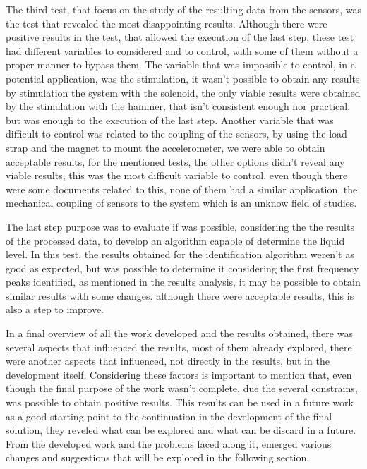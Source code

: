 The third test, that focus on the study of the resulting data from the sensors, was the test that revealed the most disappointing results. Although there were positive results in the test, that allowed the execution of the last step, these test had different variables to considered and to control, with some of them without a proper manner to bypass them. The variable that was impossible to control, in a potential application, was the stimulation, it wasn't possible to obtain any results by stimulation the system with the solenoid, the only viable results were obtained by the stimulation with the hammer, that isn't consistent enough nor practical, but was enough to the execution of the last step. Another variable that was difficult to control was related to the coupling of the sensors, by using the load strap and the magnet to mount the accelerometer, we were able to obtain acceptable results, for the mentioned tests, the other options didn't reveal any viable results, this was the most difficult variable to control, even though there were some documents related to this, none of them had a similar application, the mechanical coupling of sensors to the system which is an unknow field of studies. 

The last step purpose was to evaluate if was possible, considering the the results of the processed data, to develop an algorithm capable of determine the liquid level. In this test, the results obtained for the identification algorithm weren't as good as expected, but was possible to determine it considering the first frequency peaks identified, as mentioned in the results analysis, it may be possible to obtain similar results with some changes. although there were acceptable results, this is also a step to improve.

In a final overview of all the work developed and the results obtained, there was several aspects that influenced the results, most of them already explored, there were another aspects that influenced, not directly in the results, but in the development itself. Considering these factors is important to mention that, even though the final purpose of the work wasn't complete, due the several constrains, was possible to obtain positive results. This results can be used in a future work as a good starting point to the continuation in the development of the final solution, they reveled what can be explored and what can be discard in a future. From the developed work and the problems faced along it, emerged various changes and suggestions that will be explored in the following section. 

